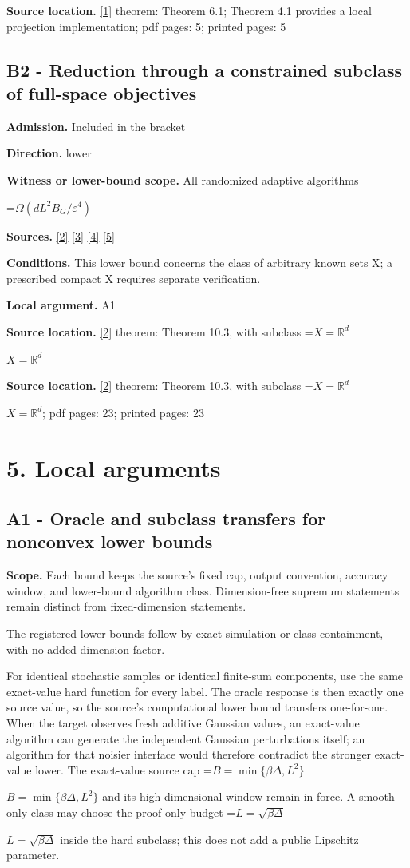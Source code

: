 \documentclass[10pt,a4paper]{article}
\newcommand{\AtlasMath}[1]{\par\begingroup\centering\setbox0=\hbox{$\displaystyle #1$}\ifdim\wd0>1.4\linewidth\typeout{ATLAS WIDE FORMULA: \the\wd0}\fi\ifdim\wd0>\linewidth\resizebox{\linewidth}{!}{\box0}\else\box0\fi\par\endgroup}
\newcommand{\AtlasInlineMath}[1]{\begingroup\setbox0=\hbox{$#1$}\ifdim\wd0>.4\linewidth\endgroup\AtlasMath{#1}\else\endgroup$#1$\fi}
\begin{document}
\textbf{Source location.} \href{https://arxiv.org/abs/2610.13787v1}{[1]} theorem: Theorem 6.1; Theorem 4.1 provides a local projection implementation; pdf pages: 5; printed pages: 5

\subsection{B2 - Reduction through a constrained subclass of full-space objectives}
\textbf{Admission.} Included in the bracket

\textbf{Direction.} lower

\textbf{Witness or lower-bound scope.} All randomized adaptive algorithms

\AtlasMath{\Omega(dL^2B_G/\varepsilon^4)}
\textbf{Sources.} \href{https://arxiv.org/html/2610.19652v1}{[2]} \href{https://arxiv.org/html/2609.00045v3}{[3]} \href{https://arxiv.org/pdf/2610.00245v2}{[4]} \href{https://arxiv.org/html/2610.17074v1}{[5]}

\textbf{Conditions.} This lower bound concerns the class of arbitrary known sets X; a prescribed compact X requires separate verification.

\textbf{Local argument.} A1

\textbf{Source location.} \href{https://arxiv.org/html/2610.19652v1}{[2]} theorem: Theorem 10.3, with subclass \AtlasInlineMath{X=\mathbb{R}^d}

\textbf{Source location.} \href{https://arxiv.org/html/2610.19652v1}{[2]} theorem: Theorem 10.3, with subclass \AtlasInlineMath{X=\mathbb{R}^d}; pdf pages: 23; printed pages: 23

\section{5. Local arguments}
\subsection{A1 - Oracle and subclass transfers for nonconvex lower bounds}
\textbf{Scope.} Each bound keeps the source's fixed cap, output convention, accuracy window, and lower-bound algorithm class. Dimension-free supremum statements remain distinct from fixed-dimension statements.

The registered lower bounds follow by exact simulation or class containment, with no added dimension factor.

For identical stochastic samples or identical finite-sum components, use the same exact-value hard function for every label. The oracle response is then exactly one source value, so the source's computational lower bound transfers one-for-one. When the target observes fresh additive Gaussian values, an exact-value algorithm can generate the independent Gaussian perturbations itself; an algorithm for that noisier interface would therefore contradict the stronger exact-value lower. The exact-value source cap \AtlasInlineMath{B=\min\{\beta\Delta,L^2\}} and its high-dimensional window remain in force. A smooth-only class may choose the proof-only budget \AtlasInlineMath{L=\sqrt{\beta\Delta}} inside the hard subclass; this does not add a public Lipschitz parameter.
\end{document}
